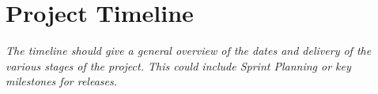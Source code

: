 \section{Project Timeline}

\textit{The timeline should give a general overview of the dates and delivery of the various stages of the project. This could include Sprint Planning or key milestones for releases.}

